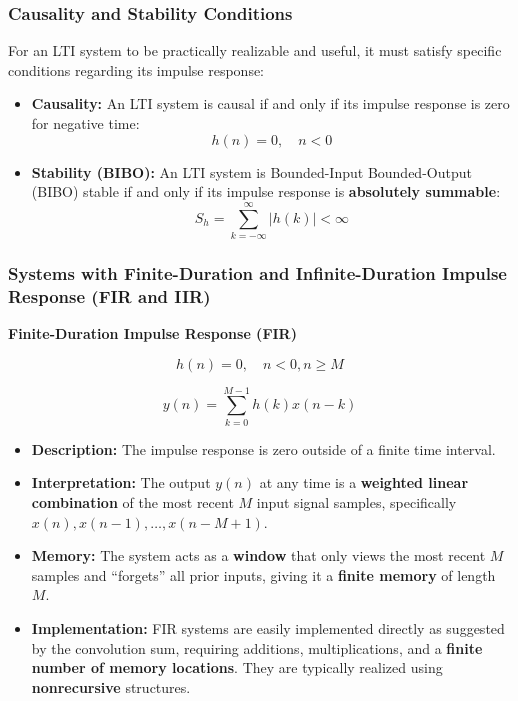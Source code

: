 \subsubsection{Causality and Stability
Conditions}\label{causality-and-stability-conditions}

For an LTI system to be practically realizable and useful, it must
satisfy specific conditions regarding its impulse response:

\begin{itemize}
\tightlist
\item
  \textbf{Causality:} An LTI system is causal if and only if its impulse
  response is zero for negative time: \[h(n) = 0, \quad n < 0\]
\item
  \textbf{Stability (BIBO):} An LTI system is Bounded-Input
  Bounded-Output (BIBO) stable if and only if its impulse response is
  \textbf{absolutely summable}:
  \[S_h = \sum_{k=-\infty}^{\infty} |h(k)| < \infty\]
\end{itemize}

\subsubsection{Systems with Finite-Duration and Infinite-Duration
Impulse Response (FIR and
IIR)}\label{systems-with-finite-duration-and-infinite-duration-impulse-response-fir-and-iir}

\textbf{Finite-Duration Impulse Response (FIR)}

\[ h(n) = 0, \quad n < 0, n ≥ M \]

\[ y(n) = \sum_{k=0}^{M-1} h(k)x(n-k) \]

\begin{itemize}
\tightlist
\item
  \textbf{Description:} The impulse response is zero outside of a finite
  time interval.
\item
  \textbf{Interpretation:} The output \(y(n)\) at any time is a
  \textbf{weighted linear combination} of the most recent \(M\) input
  signal samples, specifically \(x(n), x(n-1), \dots, x(n-M+1)\).
\item
  \textbf{Memory:} The system acts as a \textbf{window} that only views
  the most recent \(M\) samples and ``forgets'' all prior inputs, giving
  it a \textbf{finite memory} of length \(M\).
\item
  \textbf{Implementation:} FIR systems are easily implemented directly
  as suggested by the convolution sum, requiring additions,
  multiplications, and a \textbf{finite number of memory locations}.
  They are typically realized using \textbf{nonrecursive} structures.
\end{itemize}

